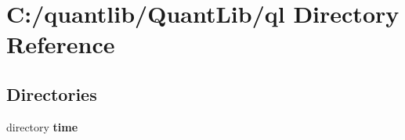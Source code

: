 \section{C\+:/quantlib/\+Quant\+Lib/ql Directory Reference}
\label{dir_3c4d42f678b4f3c9b068da768cf1b0f9}
\subsection*{Directories}
\begin{DoxyCompactItemize}
\item 
directory {\bf time}
\end{DoxyCompactItemize}
